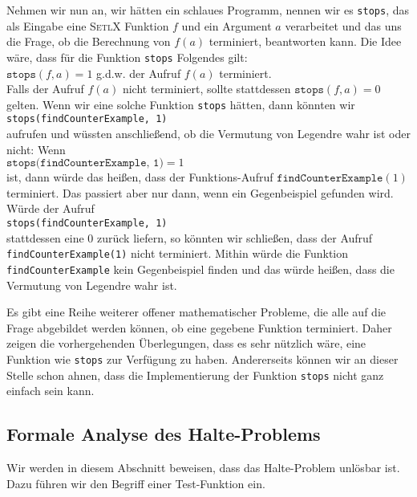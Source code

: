 Nehmen wir nun an, wir hätten ein schlaues Programm, nennen wir es \texttt{stops}, das als Eingabe
eine \textsc{SetlX} Funktion $f$ und ein Argument $a$ verarbeitet und das uns die Frage, ob die Berechnung von $f(a)$
terminiert, beantworten kann.  Die Idee wäre, dass f\"ur die Funktion \texttt{stops} Folgendes gilt:
\\[0.2cm]
\hspace*{1.3cm}
$\texttt{stops}(f, a) = 1$ \quad g.d.w. \quad der Aufruf $f(a)$ terminiert.
\\[0.2cm]
Falls der Aufruf $f(a)$ nicht terminiert,  sollte stattdessen $\texttt{stops}(f,a) = 0$ gelten.
Wenn wir eine solche Funktion \texttt{stops} hätten, dann könnten wir 
\\[0.2cm]
\hspace*{1.3cm}
\texttt{stops(findCounterExample, 1)}
\\[0.2cm]
aufrufen und wüssten anschließend, ob die Vermutung von Legendre wahr ist oder nicht:  Wenn
\\[0.2cm]
\hspace*{1.3cm}
$\texttt{stops(findCounterExample, 1)} = 1$
 \\[0.2cm]
ist, dann würde das heißen,
dass der Funktions-Aufruf $\texttt{findCounterExample}(1)$ terminiert.  Das passiert aber nur dann,
wenn ein Gegenbeispiel gefunden wird.  Würde der Aufruf 
\\[0.2cm]
\hspace*{1.3cm}
\texttt{stops(findCounterExample, 1)}
\\[0.2cm]
stattdessen eine $0$ zurück liefern, so könnten wir schließen, dass der Aufruf \texttt{findCounterExample(1)}
nicht terminiert. Mithin würde die Funktion \texttt{findCounterExample} kein Gegenbeispiel finden und
das würde heißen, dass die Vermutung von Legendre wahr ist.

Es gibt eine Reihe weiterer offener  mathematischer Probleme, die alle auf die Frage abgebildet
werden können, ob eine gegebene Funktion terminiert.  Daher zeigen die vorhergehenden Überlegungen,
dass es sehr nützlich wäre, eine Funktion wie \texttt{stops} zur Verfügung zu haben.  Andererseits
können wir an dieser Stelle schon ahnen, dass die Implementierung der Funktion \texttt{stops}
nicht ganz einfach sein kann.  

 
\subsection{Formale Analyse des Halte-Problems}
Wir werden in diesem Abschnitt beweisen, dass das Halte-Problem unlösbar ist.  Dazu führen
wir den Begriff einer Test-Funktion ein.  

